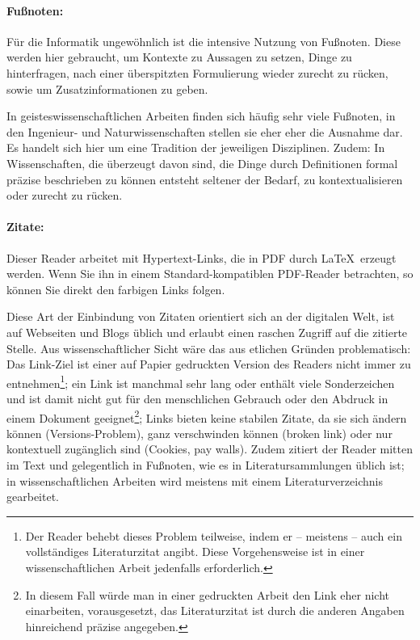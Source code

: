 \documentclass[a4paper]{article}%
\begin{document}
\paragraph{Fußnoten:}
Für die Informatik ungewöhnlich ist die intensive Nutzung von Fußnoten. Diese werden hier
gebraucht, um Kontexte zu Aussagen zu setzen, Dinge zu hinterfragen, nach einer 
überspitzten Formulierung wieder zurecht zu rücken, sowie um Zusatzinformationen zu geben.

In geisteswissenschaftlichen Arbeiten finden sich häufig sehr viele Fußnoten,
in den Ingenieur- und Naturwissenschaften stellen sie eher eher die Ausnahme dar.
Es handelt sich hier um eine Tradition der jeweiligen Disziplinen.
Zudem: In Wissenschaften, die überzeugt davon sind, die Dinge durch Definitionen formal präzise 
beschrieben zu können entsteht seltener der
Bedarf, zu kontextualisieren oder zurecht zu rücken.

\paragraph{Zitate:}
Dieser Reader arbeitet mit Hypertext-Links, die in PDF durch \LaTeX\ erzeugt werden. 
Wenn Sie ihn in einem Standard-kompatiblen
PDF-Reader betrachten, so können Sie direkt den farbigen Links folgen.

Diese Art der Einbindung von Zitaten orientiert sich an der digitalen Welt, ist auf
Webseiten und Blogs üblich und erlaubt einen raschen Zugriff auf die zitierte Stelle.
Aus wissenschaftlicher Sicht wäre das aus etlichen Gründen problematisch: Das Link-Ziel ist
einer auf Papier gedruckten Version des Readers nicht immer zu entnehmen\footnote{Der Reader behebt dieses 
Problem teilweise,
indem er -- meistens -- auch ein vollständiges Literaturzitat angibt. Diese Vorgehensweise ist
in einer wissenschaftlichen Arbeit jedenfalls erforderlich.}; 
ein Link ist manchmal sehr lang oder enthält viele Sonderzeichen und ist damit 
nicht gut für den menschlichen Gebrauch
oder den Abdruck in einem Dokument geeignet\footnote{In diesem Fall würde man in einer gedruckten
Arbeit den Link eher nicht einarbeiten, vorausgesetzt, das Literaturzitat ist durch die anderen Angaben
hinreichend präzise angegeben.}; Links bieten keine stabilen Zitate,
da sie sich ändern können (Versions-Problem), ganz verschwinden können (broken link)
oder nur kontextuell zugänglich sind (Cookies, pay walls).
Zudem zitiert der Reader mitten im Text und gelegentlich in Fußnoten, wie
es in Literatursammlungen üblich ist; in
wissenschaftlichen Arbeiten wird meistens mit einem Literaturverzeichnis gearbeitet.
\end{document}
